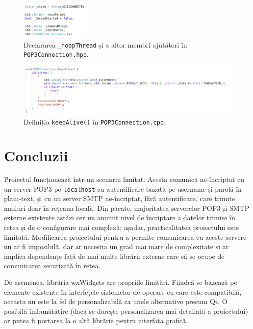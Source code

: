 \documentclass[runningheads]{llncs}
\begin{document}
\begin{figure}
    \centering
    \includegraphics[width={130px}]{noopThread.png}
    \caption{Declararea \texttt{\_noopThread} și a altor membri ajutători în \texttt{POP3Connection.hpp}.}
    \label{fig:noopThread}
\end{figure}

\begin{figure}
    \centering
    \includegraphics[width=\textwidth]{keepAlive.png}
    \caption{Definiția \texttt{keepAlive()} în \texttt{POP3Connection.cpp}.}
    \label{fig:keepalive}
\end{figure}

\section{Concluzii}

Proiectul funcționează într-un scenariu limitat. Acesta comunică ne-încriptat cu un server POP3 pe \texttt{localhost} cu autentificare bazată pe username și parolă în plain-text, și cu un server SMTP ne-încriptat, fără autentificare, care trimite mailuri doar în rețeaua locală. Din păcate, majoritatea serverelor POP3 și SMTP externe existente astăzi cer un anumit nivel de încriptare a datelor trimise în rețea și de o configurare mai complexă; așadar, practicalitatea proiectului este limitată. Modificarea proiectului pentru a permite comunicarea cu aceste servere nu ar fi imposibilă, dar ar necesita un grad mai mare de complexitate și ar implica dependențe față de mai multe librării externe care să se ocupe de comunicarea securizată în rețea.

De asemenea, librăria wxWidgets are propriile limitări. Fiindcă se bazează pe elemente existente în interfețele sistemelor de operare cu care este compatibilă\cite{ref_wxwidgets}, aceasta nu este la fel de personalizabilă ca unele alternative precum Qt. O posibilă îmbunătățire (dacă se dorește personalizarea mai detaliată a proiectului) ar putea fi portarea la o altă librărie pentru interfața grafică.
%
%
%
% 
% 
\end{document}
